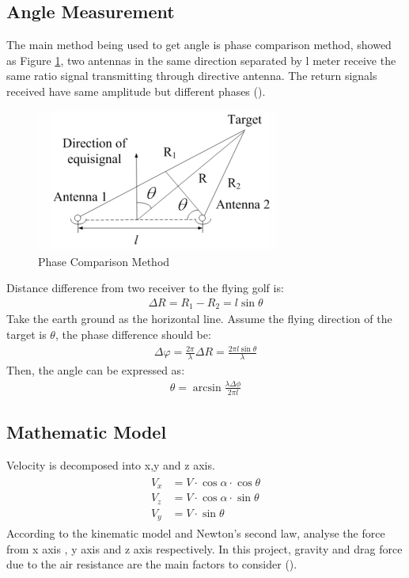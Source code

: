 \subsection{Angle Measurement}
The main method being used to get angle is phase comparison method, showed as Figure \ref{fig:phase}, two antennas in the same direction separated by l meter receive the same ratio signal transmitting through directive antenna. The return signals received have same amplitude but different phases (\cite{li2015simulation}).
\begin{figure}[H]
    \centering
    \includegraphics[width=8cm]{figure/phase.png}
    \caption{Phase Comparison Method}
    \label{fig:phase}
\end{figure}
Distance difference from two receiver to the flying golf is:
\begin{align}
    \Delta R=R_{1}-R_{2}=l \sin \theta
\end{align}
Take the earth ground as the horizontal line. Assume the flying direction of the target is $\theta$, the phase difference should be:
\begin{align}
\Delta \varphi=\frac{2 \pi}{\lambda} \Delta R=\frac{2 \pi l \sin \theta}{\lambda}
\end{align}
Then, the angle can be expressed as:
\begin{align}
 \theta=\arcsin \frac{\lambda \Delta \phi}{2 \pi l}   
\end{align}

\subsection{Mathematic Model}
Velocity is decomposed into x,y and z axis.
\begin{align}
\begin{split}
    V_{x}&=V \cdot \cos \alpha \cdot \cos \theta\\
    V_{z}&=V \cdot \cos \alpha \cdot \sin \theta\\
    V_{y}&=V \cdot \sin \theta    
\end{split}
\end{align}
According to the kinematic model and Newton’s second law, analyse the force from x axis , y axis and z axis respectively. In this project, gravity and drag force due to the air resistance are the main factors to consider (\cite{AirResistanceModels}).\\

